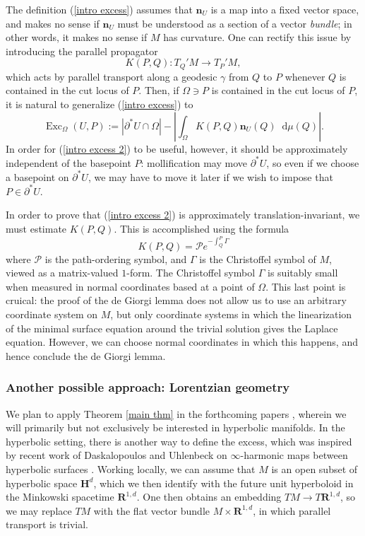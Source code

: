 \documentclass[reqno,11pt]{amsart}
\newcommand{\RR}{\mathbf{R}}
\newcommand{\Hyp}{\mathbf H}
\DeclareMathOperator{\Exc}{Exc}
\newcommand*\dif{\mathop{}\!\mathrm{d}}
\newcommand{\normal}{\mathbf n}
\theoremstyle{definition}
\numberwithin{equation}{section}
\begin{document}
The definition (\ref{intro excess}) assumes that $\normal_U$ is a map into a fixed vector space, and makes no sense if $\normal_U$ must be understood as a section of a vector \emph{bundle}; in other words, it makes no sense if $M$ has curvature.
One can rectify this issue by introducing the parallel propagator
$$K(P, Q): T_Q'M \to T_P'M,$$
which acts by parallel transport along a geodesic $\gamma$ from $Q$ to $P$ whenever $Q$ is contained in the cut locus of $P$.
Then, if $\Omega \ni P$ is contained in the cut locus of $P$, it is natural to generalize (\ref{intro excess}) to
\begin{equation}\label{intro excess 2}
\Exc_\Omega(U, P) := |\partial^* U \cap \Omega| - \left|\int_\Omega K(P, Q) \normal_U(Q) \dif \mu(Q)\right|.
\end{equation}
In order for (\ref{intro excess 2}) to be useful, however, it should be approximately independent of the basepoint $P$: mollification may move $\partial^* U$, so even if we choose a basepoint on $\partial^* U$, we may have to move it later if we wish to impose that $P \in \partial^* U$.

In order to prove that (\ref{intro excess 2}) is approximately translation-invariant, we must estimate $K(P, Q)$.
This is accomplished using the formula \cite[Chapter II, \S2]{baez1994gauge}
$$K(P, Q) = \mathcal Pe^{-\int_Q^P \Gamma}$$
where $\mathcal P$ is the path-ordering symbol, and $\Gamma$ is the Christoffel symbol of $M$, viewed as a matrix-valued $1$-form.
The Christoffel symbol $\Gamma$ is suitably small when measured in normal coordinates based at a point of $\Omega$.
This last point is cruical: the proof of the de Giorgi lemma does not allow us to use an arbitrary coordinate system on $M$, but only coordinate systems in which the linearization of the minimal surface equation around the trivial solution gives the Laplace equation.
However, we can choose normal coordinates in which this happens, and hence conclude the de Giorgi lemma.

\subsubsection{Another possible approach: Lorentzian geometry}
We plan to apply Theorem \ref{main thm} in the forthcoming papers \cite{BackusCML, BackusInfinityMaxwell1}, wherein we will primarily but not exclusively be interested in hyperbolic manifolds.
In the hyperbolic setting, there is another way to define the excess, which was inspired by recent work of Daskalopoulos and Uhlenbeck on $\infty$-harmonic maps between hyperbolic surfaces \cite{daskalopoulosPrep1}.
Working locally, we can assume that $M$ is an open subset of hyperbolic space $\Hyp^d$, which we then identify with the future unit hyperboloid in the Minkowski spacetime $\RR^{1, d}$.
One then obtains an embedding $TM \to T\RR^{1, d}$, so we may replace $TM$ with the flat vector bundle $M \times \RR^{1, d}$, in which parallel transport is trivial.
\end{document}
